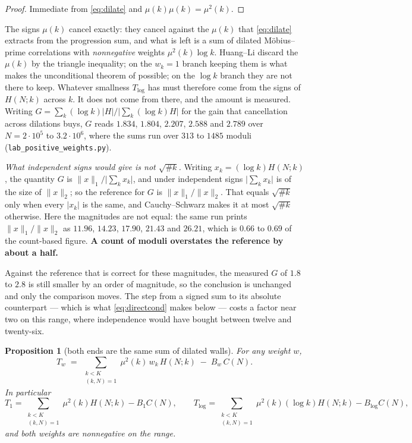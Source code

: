 \documentclass[11pt,a4paper]{article}
\theoremstyle{plain}
\newtheorem{proposition}[theorem]{Proposition}
\theoremstyle{definition}
\theoremstyle{remark}
\begin{document}
\begin{proof}
Immediate from \eqref{eq:dilate} and $\mu(k)\mu(k)=\mu^2(k)$.
\end{proof}

The signs $\mu(k)$ cancel exactly: they cancel against the $\mu(k)$
that \eqref{eq:dilate} extracts from the progression sum, and what is
left is a sum of dilated M\"obius--prime correlations with
\emph{nonnegative} weights $\mu^2(k)\log k$. Huang--Li discard the
$\mu(k)$ by the triangle inequality; on the $w_k=1$ branch keeping
them is what makes the unconditional theorem of \cite{P1} possible; on
the $\log k$ branch they are not there to keep. Whatever smallness
$T_{\log}$ has must therefore come from the signs of $H(N;k)$ across
$k$. It does not come from there, and the amount is measured. Writing
$G=\sum_k(\log k)|H|\big/\bigl|\sum_k(\log k)H\bigr|$ for the gain that
cancellation across dilations buys, $G$ reads $1.834$, $1.804$,
$2.207$, $2.588$ and $2.789$ over $N=2\cdot10^5$ to $3.2\cdot10^6$,
where the sums run over $313$ to $1485$ moduli
(\texttt{lab\_positive\_weights.py}).

\emph{What independent signs would give is not $\sqrt{\#k}$.} Writing
$x_k=(\log k)H(N;k)$, the quantity $G$ is $\lVert x\rVert_1/
\lvert\sum_kx_k\rvert$, and under independent signs
$\lvert\sum_kx_k\rvert$ is of the size of $\lVert x\rVert_2$; so the
reference for $G$ is $\lVert x\rVert_1/\lVert x\rVert_2$. That equals
$\sqrt{\#k}$ only when every $\lvert x_k\rvert$ is the same, and
Cauchy--Schwarz makes it at most $\sqrt{\#k}$ otherwise. Here the
magnitudes are not equal: the same run prints
$\lVert x\rVert_1/\lVert x\rVert_2$ as $11.96$, $14.23$, $17.90$,
$21.43$ and $26.21$, which is $0.66$ to $0.69$ of the count-based
figure. \textbf{A count of moduli overstates the reference by about a
half.}

Against the reference that is correct for these magnitudes, the
measured $G$ of $1.8$ to $2.8$ is still smaller by an order of
magnitude, so the conclusion is unchanged and only the comparison
moves. The step from a signed sum to its absolute counterpart --- which
is what \eqref{eq:directcond} makes below --- costs a factor near two
on this range, where independence would have bought between twelve and
twenty-six.

\begin{proposition}[both ends are the same sum of dilated walls]%
\label{prop:flatsum}
For any weight $w$,
\begin{equation}\label{eq:flatsum}
  T_w\;=\;\sum_{\substack{k<K\\(k,N)=1}}\mu^2(k)\,w_k\,H(N;k)
   \;-\;B_w\,C(N).
\end{equation}
In particular
\[
  T_1=\!\!\sum_{\substack{k<K\\(k,N)=1}}\!\!\mu^2(k)H(N;k)-B_1C(N),
  \qquad
  T_{\log}=\!\!\sum_{\substack{k<K\\(k,N)=1}}\!\!\mu^2(k)(\log k)H(N;k)
   -B_{\log}C(N),
\]
and both weights are nonnegative on the range.
\end{proposition}
\end{document}
